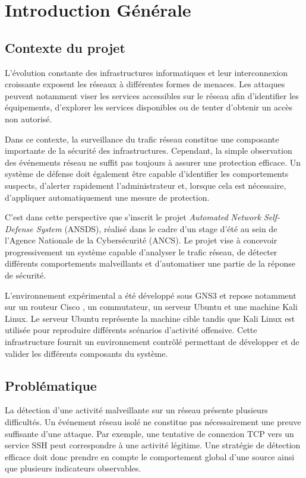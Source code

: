 \chapter{Introduction Générale}

\section{Contexte du projet}

L’évolution constante des infrastructures informatiques et leur interconnexion
croissante exposent les réseaux à différentes formes de menaces. Les attaques
peuvent notamment viser les services accessibles sur le réseau afin d’identifier les équipements, d’explorer les services disponibles ou de tenter d’obtenir un accès non autorisé.

Dans ce contexte, la surveillance du trafic réseau constitue une composante
importante de la sécurité des infrastructures. Cependant, la simple observation
des événements réseau ne suffit pas toujours à assurer une protection efficace.
Un système de défense doit également être capable d’identifier les comportements
suspects, d’alerter rapidement l’administrateur et, lorsque cela est nécessaire,
d’appliquer automatiquement une mesure de protection.

C’est dans cette perspective que s’inscrit le projet
\textit{Automated Network Self-Defense System} (ANSDS), réalisé dans le cadre
d’un stage d’été au sein de l’Agence Nationale de la Cybersécurité (ANCS).
Le projet vise à concevoir progressivement un système capable d’analyser le
trafic réseau, de détecter différents comportements malveillants et
d’automatiser une partie de la réponse de sécurité.

L’environnement expérimental a été développé sous GNS3 \cite{gns3_docs} et repose notamment sur
un routeur Cisco \cite{cisco_ios}, un commutateur, un serveur Ubuntu et une machine Kali Linux.
Le serveur Ubuntu représente la machine cible tandis que Kali Linux est utilisée
pour reproduire différents scénarios d’activité offensive. Cette infrastructure
fournit un environnement contrôlé permettant de développer et de valider les
différents composants du système.

\section{Problématique}

La détection d’une activité malveillante sur un réseau présente plusieurs
difficultés. Un événement réseau isolé ne constitue pas nécessairement une
preuve suffisante d’une attaque. Par exemple, une tentative de connexion TCP
vers un service SSH peut correspondre à une activité légitime. Une stratégie de
détection efficace doit donc prendre en compte le comportement global d’une
source ainsi que plusieurs indicateurs observables.


